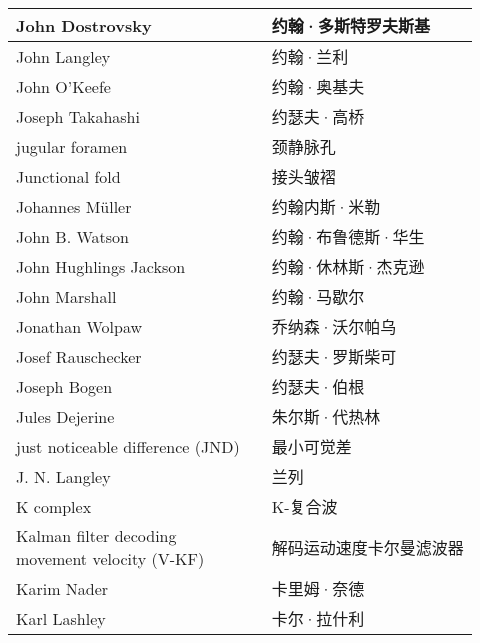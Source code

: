 \begin{longtable}{lll}
	\midrule
	John Dostrovsky   && 约翰·多斯特罗夫斯基  \\
	
	\midrule
	John Langley   && 约翰·兰利  \\
	
	\midrule
	John O’Keefe   && 约翰·奥基夫  \\
	
	\midrule
	Joseph Takahashi   && 约瑟夫·高桥  \\
	
	\midrule
	jugular foramen   && 颈静脉孔  \\
	
	\midrule
	Junctional fold   && 接头皱褶  \\
	
	\midrule
	Johannes Müller   && 约翰内斯·米勒  \\
	
	\midrule
	John B. Watson   && 约翰·布鲁德斯·华生  \\
	
	\midrule
	John Hughlings Jackson   && 约翰·休林斯·杰克逊  \\
	
	\midrule
	John Marshall   && 约翰·马歇尔  \\
	
	\midrule
	Jonathan Wolpaw   && 乔纳森·沃尔帕乌  \\
	
	\midrule
	Josef Rauschecker   && 约瑟夫·罗斯柴可  \\
	
	\midrule
	Joseph Bogen   && 约瑟夫·伯根  \\
	
	\midrule
	Jules Dejerine   && 朱尔斯·代热林  \\
	
	\midrule
	just noticeable difference (JND)   && 最小可觉差  \\
	
	\midrule
	J. N. Langley   && 兰列  \\
	
	\midrule
	K complex   && K-复合波  \\
	
	\midrule
	\makecell{Kalman filter decoding \\movement velocity (V-KF)}   && 解码运动速度卡尔曼滤波器  \\
	
	\midrule
	Karim Nader   && 卡里姆·奈德  \\
	
	\midrule
	Karl Lashley  && 卡尔·拉什利  \\
	

\end{longtable}
